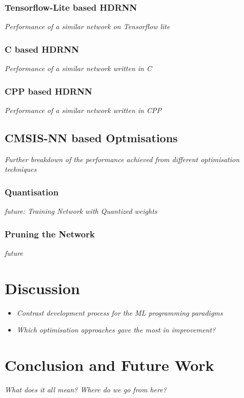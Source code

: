 \subsection[Tensorflow Lite]{Tensorflow-Lite based HDRNN}
\textit{Performance of a similar network on Tensorflow lite}

\subsection[C]{C based HDRNN}
\textit{Performance of a similar network written in C}


\subsection[CPP - Eigen]{CPP based HDRNN}
\textit{Performance of a similar network written in CPP}

\section{CMSIS-NN based Optmisations}
\textit{Further breakdown of the performance achieved from different optimisation techniques}

\subsection{Quantisation}
\textit{future: Training Network with Quantized weights}

\subsection{Pruning the Network}
\textit{future}

\chapter{Discussion}
\begin{itemize}
	\item \textit{Contrast development process for the ML programming paradigms}
	\item \textit{Which optimisation approaches gave the most in improvement?}
\end{itemize}

\chapter{Conclusion and Future Work}
\textit{What does it all mean? Where do we go from here?}
